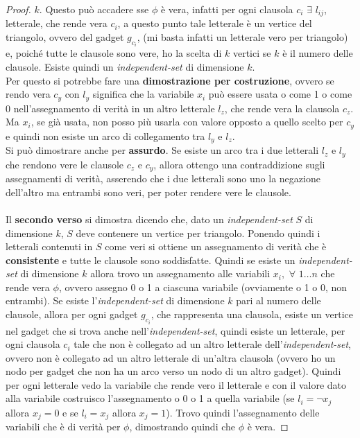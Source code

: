 \begin{esempio}
\begin{proof}
									$k$. Questo può accadere sse $\phi$ è vera, infatti per ogni clausola $c_i$
									$\exists \,\,l_{ij}$, letterale, che rende vera $c_i$, a questo punto tale
									letterale è un vertice del triangolo, ovvero del gadget $g_{c_i}$, (mi basta
									infatti un letterale vero per triangolo) e, poiché
									tutte le clausole sono vere, ho la scelta di $k$ vertici se $k$ è il numero
									delle clausole. Esiste quindi un \textit{independent-set} di dimensione
									$k$.\\
									Per questo si potrebbe fare una \textbf{dimostrazione per costruzione},
									ovvero se rendo vera $c_y$ con $l_y$ significa che la variabile $x_i$ può
									essere usata o come 1 o come 0 nell'assegnamento di verità in un altro
									letterale $l_z$, che rende vera la clausola $c_z$. Ma $x_i$, se già usata,
									non posso più usarla con valore opposto a quello scelto per $c_y$ e quindi
									non esiste un arco di collegamento tra $l_y$ e $l_z$.\\
									Si può dimostrare anche per \textbf{assurdo}. Se esiste un arco tra i due
									letterali $l_z$ e $l_y$ che rendono vere le clausole $c_z$ e $c_y$,
									allora ottengo una contraddizione sugli assegnamenti di verità, asserendo
									che i due letterali sono uno la negazione dell'altro ma entrambi sono
									veri, per poter rendere vere le clausole. 
									\\
									\\
									Il \textbf{secondo verso} si dimostra dicendo che, dato un
									\textit{independent-set} 
									$S$ di dimensione $k$, $S$ deve contenere un vertice per triangolo. Ponendo
									quindi i letterali contenuti in $S$ come veri si ottiene un assegnamento di
									verità che è \textbf{consistente} e tutte le clausole sono soddisfatte.
									Quindi se esiste un \textit{independent-set} di dimensione $k$ allora trovo
									un assegnamento alle variabili $x_i,\,\,\forall \,\,1\ldots n$ che rende
									vera $\phi$, ovvero assegno 0 o 1 a ciascuna variabile (ovviamente o 1 o 0,
									non entrambi). Se esiste l'\textit{independent-set} di dimensione $k$ pari
									al numero delle clausole, allora per ogni gadget $g_{c_i}$,
									che rappresenta una clausola, esiste un vertice nel gadget che si trova
									anche nell'\textit{independent-set}, quindi esiste un letterale, per ogni
									clausola $c_i$ tale che non è collegato ad un altro letterale
									dell'\textit{independent-set}, ovvero non è collegato ad un altro letterale
									di un'altra clausola (ovvero ho un nodo per gadget che non ha un arco verso
									un nodo di un altro gadget). Quindi per ogni letterale vedo la variabile che
									rende vero il letterale e con il valore dato alla variabile costruisco
									l'assegnamento o 0 o 1 a quella variabile (se $l_i=\neg x_j$ allora
									$x_j=0$ e se $l_i= x_j$ allora $x_j=1$). Trovo quindi l'assegnamento delle
									variabili che è di verità per $\phi$, dimostrando quindi che $\phi$ è vera.
								\end{proof}
								\end{esempio}
